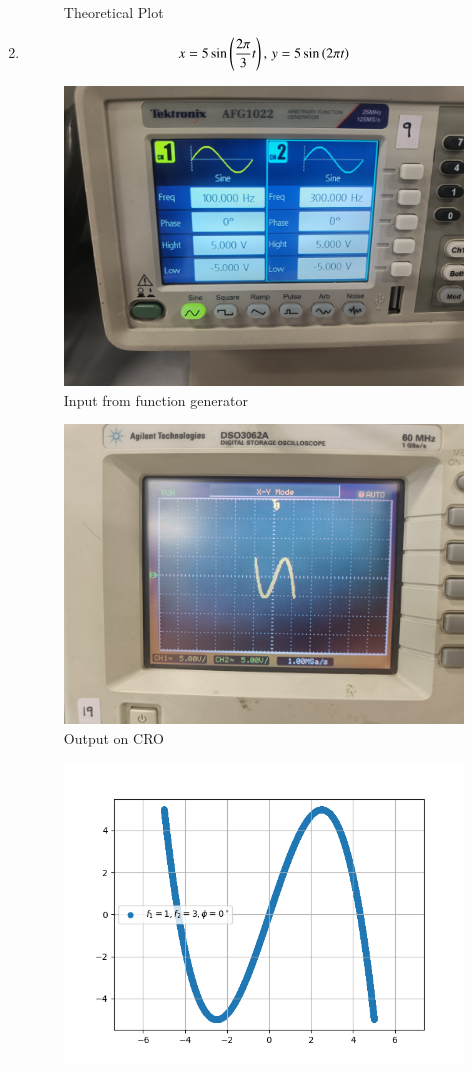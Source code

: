 \documentclass[journal]{IEEEtran}
\begin{document}
\begin{enumerate}
\begin{figure}[H]
        \caption{Theoretical Plot}
    \end{figure}
    \item \begin{align}
        x = 5\sin\left(\frac{2\pi}{3}t\right),\,y = 5\sin\left({2\pi}t\right)
    \end{align}
    \begin{figure}[H]
        \centering
        \includegraphics[width=0.7\columnwidth]{pics/WhatsApp Image 2025-01-24 at 11.02.16.jpeg}
        \caption{Input from function generator}
    \end{figure}
    \begin{figure}[H]
        \centering
        \includegraphics[width=0.7\columnwidth]{pics/WhatsApp Image 2025-01-24 at 11.02.14.jpeg}
        \caption{Output on CRO}
    \end{figure}
    \begin{figure}[H]
        \centering
        \includegraphics[width=0.7\columnwidth]{figs/fig5.png}

\end{figure}
\end{enumerate}
\end{document}
